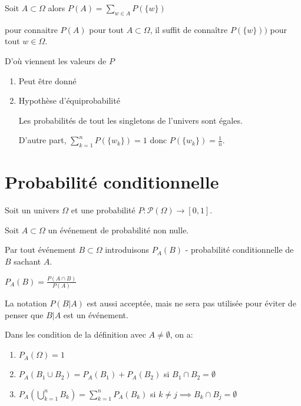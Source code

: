 \documentclass[a4paper, 12pt]{article}
\begin{document}
\begin{corollaire}
    Soit $A \subset \Omega$ alors $P(A) = \sum\limits_{w \in A} P(\{w\})$
\end{corollaire}

\begin{remark}
    pour connaitre $P(A)$ pour tout $A \subset \Omega$, il suffit de connaître $P(\{w\}))$ pour tout $w \in \Omega$.
\end{remark}

\begin{definition}
    D'où viennent les valeurs de $P$

    \begin{enumerate}
        \item Peut être donné
        \item Hypothèse d'équiprobabilité
        
            Les probabilités de tout les singletons de l'univers sont égales.
            
            D'autre part, $\sum\limits_{k=1}^n P(\{w_k\}) = 1$ donc $P(\{w_k\}) = \frac{1}{n}$.
    \end{enumerate}
\end{definition}

\section{Probabilité conditionnelle}

\begin{definition}
    Soit un univers $\Omega$ et une probabilité $P: \mathcal{P}(\Omega) \to [0, 1]$.

    Soit $A \subset \Omega$ un événement de probabilité non nulle.

    Par tout événement $B \subset \Omega$ introduisons $P_A(B)$ - probabilité conditionnelle de $B$ sachant $A$.

    $P_A(B) = \frac{P(A \cap B)}{P(A)}$
\end{definition}

\begin{remark}
    La notation $P(B | A)$ est aussi acceptée, mais ne sera pas utilisée pour éviter de penser que $B | A$ est un événement.
\end{remark}

\begin{proposition}
    Dans les condition de la définition avec $A \neq \emptyset$, on a:
    \begin{enumerate}
        \item $P_A(\Omega) = 1$
        \item $P_A(B_1 \cup B_2) = P_A(B_1) + P_A(B_2)$ si $B_1 \cap B_2 = \emptyset$
        \item $P_A(\bigcup\limits_{k=1}^n B_k) = \sum\limits_{k=1}^n P_A(B_k)$ si $k \neq j \implies B_k \cap B_j = \emptyset$
    \end{enumerate}
\end{proposition}
\end{document}
